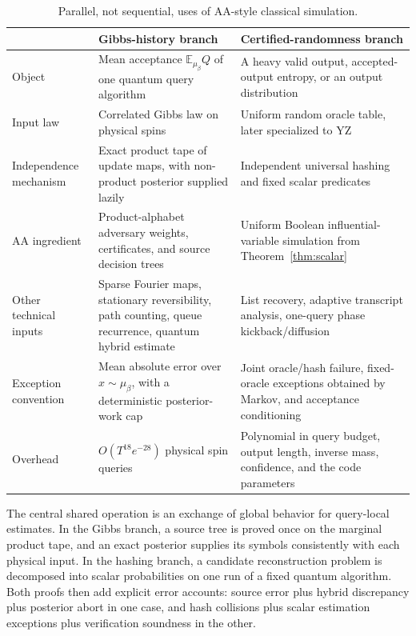 \documentclass[11pt]{article}
\theoremstyle{definition}\newtheorem{definition}[theorem]{Definition}
\theoremstyle{remark}\newtheorem{remark}[theorem]{Remark}
\newcommand{\E}{\mathbb E}\newcommand{\Prb}{\mathbb P}
\begin{document}
\begin{table}[htbp]
\centering\small
\begin{tabularx}{\textwidth}{@{}>{\raggedright\arraybackslash}p{}>{\raggedright\arraybackslash}X>{\raggedright\arraybackslash}X@{}}
\toprule
& \textbf{Gibbs-history branch} & \textbf{Certified-randomness branch}\\
\midrule
Object & Mean acceptance \(\E_{\mu_\beta}Q\) of one quantum query algorithm & A heavy valid output, accepted-output entropy, or an output distribution\\
Input law & Correlated Gibbs law on physical spins & Uniform random oracle table, later specialized to YZ\\
Independence mechanism & Exact product tape of update maps, with non-product posterior supplied lazily & Independent universal hashing and fixed scalar predicates\\
AA ingredient & Product-alphabet adversary weights, certificates, and source decision trees & Uniform Boolean influential-variable simulation from Theorem~\ref{thm:scalar}\\
Other technical inputs & Sparse Fourier maps, stationary reversibility, path counting, queue recurrence, quantum hybrid estimate & List recovery, adaptive transcript analysis, one-query phase kickback/diffusion\\
Exception convention & Mean absolute error over \(x\sim\mu_\beta\), with a deterministic posterior-work cap & Joint oracle/hash failure, fixed-oracle exceptions obtained by Markov, and acceptance conditioning\\
Overhead & \(O(T^{18}e^{-28})\) physical spin queries & Polynomial in query budget, output length, inverse mass, confidence, and the code parameters\\
\bottomrule
\end{tabularx}
\caption{Parallel, not sequential, uses of AA-style classical simulation.}\label{tab:branches}
\end{table}

The central shared operation is an exchange of global behavior for query-local estimates. In the Gibbs branch, a source tree is proved once on the marginal product tape, and an exact posterior supplies its symbols consistently with each physical input. In the hashing branch, a candidate reconstruction problem is decomposed into scalar probabilities on one run of a fixed quantum algorithm. Both proofs then add explicit error accounts: source error plus hybrid discrepancy plus posterior abort in one case, and hash collisions plus scalar estimation exceptions plus verification soundness in the other.
\end{document}
